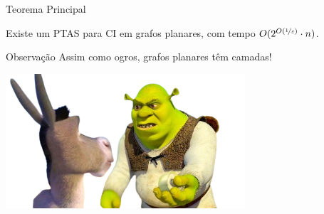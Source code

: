 \begin{frame}{Teorema Principal}
    \begin{thm} \label{teo1}
            Existe um PTAS para CI em grafos planares, com tempo $O(2^{O(\nicefrac{1}{\varepsilon})} \cdot n)$.
        \end{thm}
\end{frame}

\begin{frame}{Observação}
    \centering
    \vspace{1cm}
    \pause
    \Large Assim como ogros, grafos planares têm camadas!
    \begin{minipage}{\linewidth}
        \centering
        \vspace{1.73cm}
        \includegraphics[height=5cm]{images/shrek.png}
    \end{minipage}
\end{frame}

